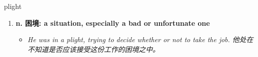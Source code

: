 
\begin{frame}
{\huge plight}
\begin{center}
\begin{enumerate}\Large
  \item \textbf{n. 困境: a situation, especially a bad or unfortunate one}
  \begin{itemize}
    \item \em{\Large{He was in a plight, trying to decide whether or not to take the job. 他处在不知道是否应该接受这份工作的困境之中。}}
  \end{itemize}
\end{enumerate}
\end{center}
\end{frame}
